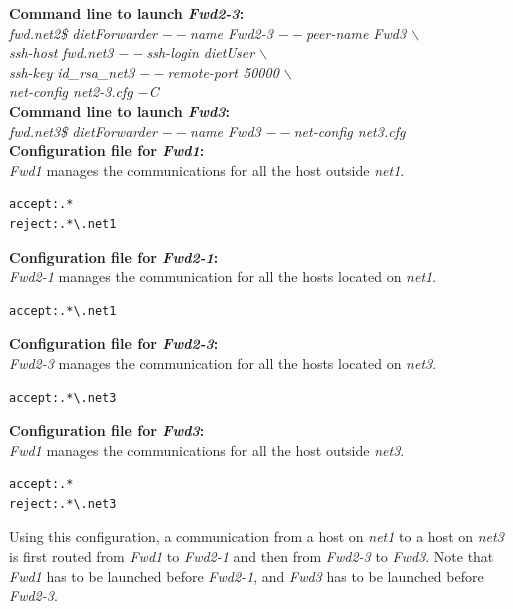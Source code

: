 \noindent\textbf{Command line to launch \textit{Fwd2-3}: }\\
{\small \it fwd.net2\$ dietForwarder {\tiny$--$}name Fwd2-3
  {\tiny$--$}peer-name Fwd3 $\backslash$\\
  \hspace*{4.2cm}{\tiny$--$}ssh-host fwd.net3 {\tiny$--$}ssh-login
  dietUser $\backslash$\\
  \hspace*{4.2cm}{\tiny$--$}ssh-key id\_rsa\_net3
  {\tiny$--$}remote-port 50000 $\backslash$\\
  \hspace*{4.2cm}{\tiny$--$}net-config net2-3.cfg {\tiny$-$}C}\\[2mm]

\noindent\textbf{Command line to launch \textit{Fwd3}: }\\
{\small \it fwd.net3\$ dietForwarder {\tiny$--$}name Fwd3
  {\tiny$--$}net-config net3.cfg}\\[3mm]

\noindent\textbf{Configuration file for \textit{Fwd1}:}\\
\textit{Fwd1} manages the communications for all the host outside
\textit{net1}.
\begin{verbatim}
accept:.*
reject:.*\.net1
\end{verbatim}

\noindent\textbf{Configuration file for \textit{Fwd2-1}:}\\
\textit{Fwd2-1} manages the communication for all the hosts located on
\textit{net1}.
\begin{verbatim}
accept:.*\.net1
\end{verbatim}

\noindent\textbf{Configuration file for \textit{Fwd2-3}:}\\
\textit{Fwd2-3} manages the communication for all the hosts located on
\textit{net3}.
\begin{verbatim}
accept:.*\.net3
\end{verbatim}

\noindent\textbf{Configuration file for \textit{Fwd3}:}\\
\textit{Fwd1} manages the communications for all the host outside
\textit{net3}.
\begin{verbatim}
accept:.*
reject:.*\.net3
\end{verbatim}

Using this configuration, a communication from a host on \textit{net1}
to a host on \textit{net3} is first routed from \textit{Fwd1} to
\textit{Fwd2-1} and then from \textit{Fwd2-3} to \textit{Fwd3}.
Note that \textit{Fwd1} has to be launched before \textit{Fwd2-1}, and
\textit{Fwd3} has to be launched before \textit{Fwd2-3}.